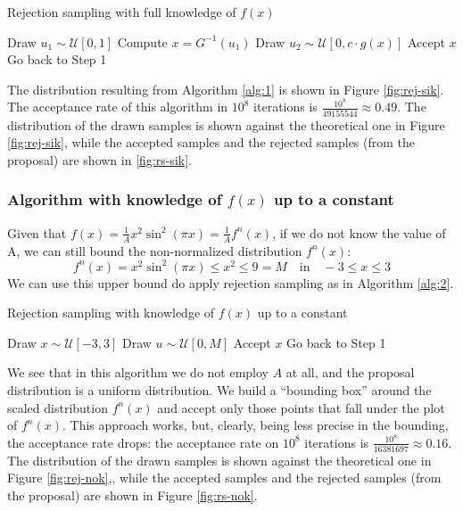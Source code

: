 \documentclass[a4paper,12pt]{article}
\begin{document}
\begin{algorithm}
  \caption{Rejection sampling with full knowledge of $f(x)$} \label{alg:1}
  \begin{algorithmic}[1]
    \STATE Draw $u_1 \sim \mathcal{U}[0,1]$
    \STATE Compute $x = G^{-1}(u_1)$
    \STATE Draw $u_2 \sim \mathcal{U}[0, c \cdot g(x)]$
    \STATE Accept $x$
    \ELSE
    \STATE Go back to Step 1
    \ENDIF
  \end{algorithmic}
\end{algorithm}

The distribution resulting from Algorithm \ref{alg:1} is shown in Figure \ref{fig:rej-sik}. The acceptance rate of this algorithm in $10^8$ iterations is $\frac{10^8}{49155544} \approx 0.49$. The distribution of the drawn samples is shown against the theoretical one in Figure \ref{fig:rej-sik}, while the accepted samples and the rejected samples (from the proposal) are shown in \ref{fig:rs-sik}.

\subsubsection*{Algorithm with knowledge of $f(x)$ up to a constant}
Given that $f(x) = \frac{1}{A}x^2\sin^2(\pi x)=\frac{1}{A}f^n(x)$, if we do not know the value of A, we can still bound the non-normalized distribution $f^{n}(x)$:
\begin{equation}
  f^n(x) = x^2\sin^2(\pi x) \leq x^2 \leq 9 = M\quad \text{in}\quad -3\leq x\leq3
\end{equation}
We can use this upper bound do apply rejection sampling as in Algorithm \ref{alg:2}.

\begin{algorithm}
  \caption{Rejection sampling with knowledge of $f(x)$ up to a constant}
  \label{alg:2}
  \begin{algorithmic}[1]
    \STATE Draw $x \sim \mathcal{U}[-3,3]$
    \STATE Draw $u \sim \mathcal{U}[0, M]$
    \STATE Accept $x$
    \ELSE
    \STATE Go back to Step 1
    \ENDIF
  \end{algorithmic}
\end{algorithm}

We see that in this algorithm we do not employ $A$ at all, and the proposal distribution is a uniform distribution. We build a ``bounding box'' around the scaled distribution $f^n(x)$ and accept only those points that fall under the plot of $f^n(x)$. This approach works, but, clearly, being less precise in the bounding, the acceptance rate drops: the acceptance rate on $10^8$ iterations is $\frac{10^8}{16381697} \approx 0.16$. The distribution of the drawn samples is shown against the theoretical one in Figure \ref{fig:rej-nok},, while the accepted samples and the rejected samples (from the proposal) are shown in Figure \ref{fig:rs-nok}.
\end{document}
